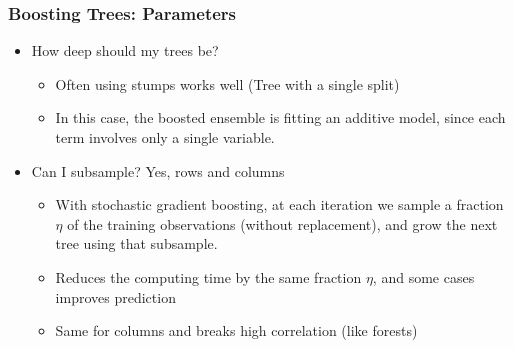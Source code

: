 \documentclass[
  shownotes,
  xcolor={svgnames},
  hyperref={colorlinks,citecolor=DarkBlue,linkcolor=DarkRed,urlcolor=DarkBlue}
  , aspectratio=169]{beamer}
\begin{document}
\begin{frame}[fragile]
\frametitle{Boosting Trees: Parameters}
\begin{itemize}
\item How deep should my trees be?
\begin{itemize}
  \item Often using stumps works well (Tree with a single split)
  \medskip
  \item In this case, the boosted ensemble is fitting an additive model, since each term involves only a single variable.
\medskip
\end{itemize}

\item Can I subsample? Yes, rows and columns
\medskip
\begin{itemize}
\item With stochastic gradient boosting, at each iteration we sample a fraction $\eta$ of the training observations (without replacement), and grow the next tree using that subsample. 
\medskip
\item Reduces the computing time by the same fraction $\eta$, and some cases improves prediction
\medskip
\item Same for columns and breaks high correlation (like forests)
\end{itemize}
\end{itemize}
\end{frame}
\end{document}
